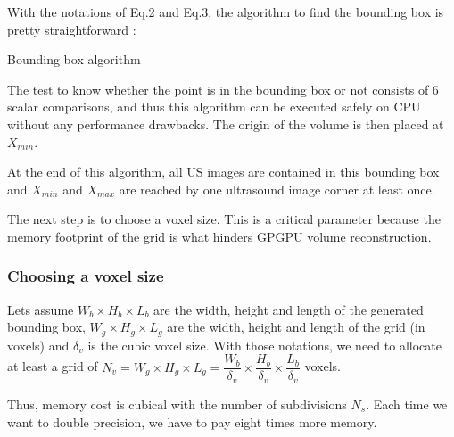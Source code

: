 \documentclass[12pt,journal,compsoc]{IEEEtran}
\begin{document}
With the notations of Eq.2 and Eq.3, the algorithm to find the bounding box is pretty straightforward :

\begin{samepage}
\begin{algorithm}
\caption{Bounding box algorithm}
\label{bbox_algo}
\end{algorithm}
\end{samepage}

\newpage
The test to know whether the point is in the bounding box or not consists of 6 scalar comparisons, and thus this algorithm can be executed safely on CPU without any performance drawbacks.
The origin of the volume is then placed at $X_{min}$.

At the end of this algorithm, all US images are contained in this bounding box and $X_{min}$ and $X_{max}$ are reached by one ultrasound image corner at least once.

The next step is to choose a voxel size. This is a critical parameter because the memory footprint of the grid is what hinders GPGPU volume reconstruction. 

\subsubsection{Choosing a voxel size}

Lets assume $W_b\times H_b\times L_b$ are the width, height and length of the generated bounding box, $W_g\times H_g\times L_g$ are the width, height and length of the grid (in voxels) and $\delta_v$ is the cubic voxel size. With those notations, we need to allocate at least a grid of $N_v = W_g\times H_g\times L_g =  \dfrac{W_b}{\delta_v}\times \dfrac{H_b}{\delta_v}\times \dfrac{L_b}{\delta_v}$ voxels. \par

\vspace{0.2cm}
Thus, memory cost is cubical with the number of subdivisions $N_s$. Each time we want to double precision, we have to pay eight times more memory.
\end{document}
